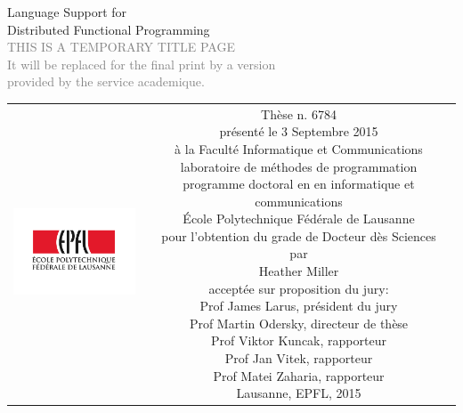 \begin{titlepage}
\begin{center}
\sffamily


\null\vspace{2cm}
{\huge Language Support for \\[12pt] Distributed Functional Programming} \\[24pt]
\textcolor{gray}{\small{THIS IS A TEMPORARY TITLE PAGE \\ It will be replaced for the final print by a version \\ provided by the service academique.}}

\vfill

\begin{tabular} {cc}
\parbox{0.3\textwidth}{\includegraphics[width=4cm]{images/epfl}}
&
\parbox{0.7\textwidth}{%
	Thèse n. 6784\\
	présenté le 3 Septembre 2015\\
	à la Faculté Informatique et Communications\\
	laboratoire de méthodes de programmation\\
	programme doctoral en en informatique et communications\\
%
	École Polytechnique Fédérale de Lausanne\\[6pt]
	pour l'obtention du grade de Docteur dès Sciences\\
	par\\ [4pt]
	\null \hspace{3em} Heather Miller\\[9pt]
%
\small
acceptée sur proposition du jury:\\[4pt]
%
    Prof James Larus, président du jury\\
    Prof Martin Odersky, directeur de thèse\\
    Prof Viktor Kuncak, rapporteur\\
    Prof Jan Vitek, rapporteur\\
    Prof Matei Zaharia, rapporteur\\[12pt]
%
Lausanne, EPFL, 2015}
\end{tabular}
\end{center}
\vspace{2cm}
\end{titlepage}
